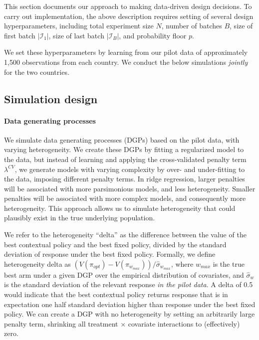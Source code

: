 \documentclass[letterpaper, 12pt, parskip=full,DIV=10]{scrartcl}
\begin{document}
This section documents our approach to making data-driven design decisions. To carry out implementation, the above description requires setting of several design hyperparameters, including total experiment size $N$, number of batches $B$,  size of first batch $|\mathcal{I}_1|$, size of last batch $|\mathcal{I}_B|$, and probability floor $p$. 

We set these hyperparameters by learning from our pilot data of approximately 1,500 observations from each country. We conduct the below simulations \textit{jointly} for the two countries.

\subsection{Simulation design}
\paragraph{Data generating processes} 

We simulate data generating processes (DGPs) based on the pilot data, with varying heterogeneity. We create these DGPs by fitting a regularized model to the data, but instead of learning and applying the cross-validated penalty term $\lambda^{CV}$, we generate models with varying complexity by over- and under-fitting to the data, imposing different penalty terms. In ridge regression, larger penalties will be associated with more parsimonious models, and less heterogeneity. Smaller penalties will be associated with more complex models, and consequently more heterogeneity. This approach allows us to simulate heterogeneity that could plausibly exist in the true underlying population. 


We refer to the heterogeneity ``delta'' as the difference between the value of the best contextual policy and the best fixed policy, divided by the standard deviation of response under the best fixed policy. Formally, we define heterogeneity delta as $\left({V}({\pi}_{opt})-{V}({\pi}_{w_{max}})\right)/\hat\sigma_{w_{max}}$, where $w_{max}$ is the true best arm under a given DGP over the empirical distribution of covariates, and $\hat\sigma_{w}$ is the standard deviation of the relevant response \textit{in the pilot data}. A delta of 0.5 would indicate that the best contextual policy returns response that is in expectation one half standard deviation higher than response under the best fixed policy. We can create a DGP with no heterogeneity by setting an arbitrarily large penalty term, shrinking all treatment $\times$ covariate interactions to (effectively) zero. 
\end{document}
